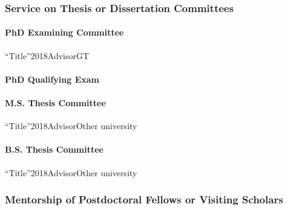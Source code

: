     \subsubsection{Service on Thesis or Dissertation Committees}
    \label{subsec:member}
        \paragraph{PhD Examining Committee}
            \begin{subnum}
                {``Title''}{2018}{Advisor}{GT}
            \end{subnum}

        \paragraph{PhD Qualifying Exam}
            \begin{subnum}
                \setcounter{subitemno}{99} %
            \end{subnum}

        \paragraph{M.S. Thesis Committee}
            \begin{subnum}
                \setcounter{subitemno}{99} %
                {``Title''}{2018}{Advisor}{Other university}
            \end{subnum}

        \paragraph{B.S. Thesis Committee}
            \begin{subnum}
                \setcounter{subitemno}{99} %
                {``Title''}{2018}{Advisor}{Other university}
            \end{subnum}

\subsubsection{Mentorship of Postdoctoral Fellows or Visiting Scholars}

